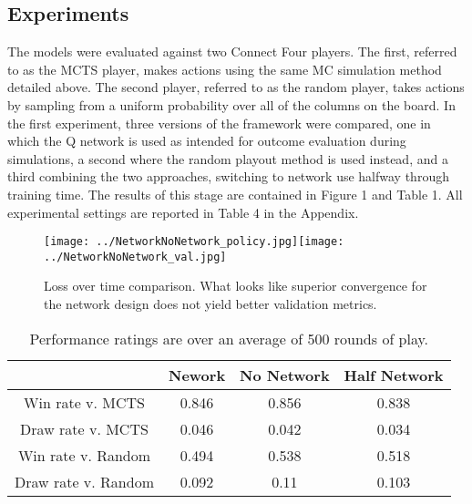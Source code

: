 \documentclass[twoside,11pt]{article}
\begin{document}


\subsection{Experiments}
The models were evaluated against two Connect Four players. The first, referred to
as the MCTS player, makes actions using the same MC simulation method detailed above.
The second player, referred to as the random player, takes actions by sampling 
from a uniform probability over all of the columns on the board. 
In the first experiment, three versions of the framework were compared, 
one in which the Q network is used
as intended for outcome evaluation during simulations, a second where the random 
playout method is used instead, and a third combining 
the two approaches, switching to network use halfway through training time.
The results of this stage are contained in Figure 1 and Table 1. All experimental settings
are reported in Table 4 in the Appendix.

\begin{figure}[h]
    \centering
    \texttt{[image: ../NetworkNoNetwork\_policy.jpg]}\texttt{[image: ../NetworkNoNetwork\_val.jpg]}
    \caption{Loss over time comparison. What looks like superior convergence for the network design does not yield 
     better validation metrics.}
\end{figure}

\begin{table}[ht]
\caption{Performance ratings are over an average of 500 rounds of play.}
\begin{center}
    \begin{tabular}{||c ||c c c||} 
    \hline
     & Nework & No Network & Half Network \\ [0.5ex] 
    \hline\hline
    Win rate v. MCTS & 0.846 & 0.856 & 0.838\\ 
    \hline
    Draw rate v. MCTS & 0.046 & 0.042 & 0.034 \\
    \hline
    Win rate v. Random & 0.494 & 0.538 & 0.518 \\
    \hline
    Draw rate v. Random & 0.092 & 0.11 & 0.103 \\
    \hline
   \end{tabular}
   \end{center}
\end{table}
\end{document}
